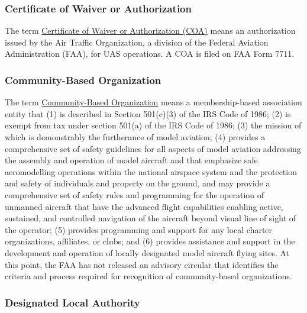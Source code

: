 \documentclass[
]{book}
\begin{document}
\hypertarget{COA}{%
\subsubsection*{Certificate of Waiver or Authorization}\label{COA}}

The term \protect\hyperlink{COA}{Certificate of Waiver or Authorization (COA)} means an authorization issued by the Air Traffic Organization, a division of the Federal Aviation Administration (FAA), for UAS operations. A COA is filed on FAA Form 7711.





\hypertarget{CBO}{%
\subsubsection*{Community-Based Organization}\label{CBO}}

The term \protect\hyperlink{CBO}{Community-Based Organization} means a membership-based association entity that (1) is described in Section 501(c)(3) of the IRS Code of 1986; (2) is exempt from tax under section 501(a) of the IRS Code of 1986; (3) the mission of which is demonstrably the furtherance of model aviation; (4) provides a comprehensive set of safety guidelines for all aspects of model aviation addressing the assembly and operation of model aircraft and that emphasize safe aeromodelling operations within the national airspace system and the protection and safety of individuals and property on the ground, and may provide a comprehensive set of safety rules and programming for the operation of unmanned aircraft that have the advanced flight capabilities enabling active, sustained, and controlled navigation of the aircraft beyond visual line of sight of the operator; (5) provides programming and support for any local charter organizations, affiliates, or clubs; and (6) provides assistance and support in the development and operation of locally designated model aircraft flying sites. At this point, the FAA has not released an advisory circular that identifies the criteria and process required for recognition of community-based organizations.





\hypertarget{DLA}{%
\subsubsection*{Designated Local Authority}\label{DLA}}
\end{document}
